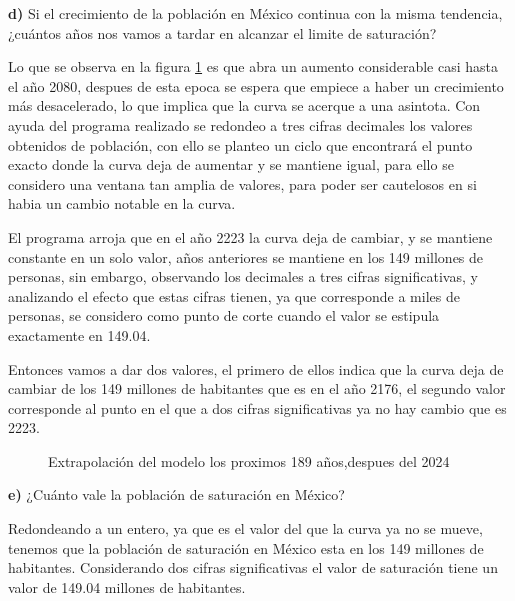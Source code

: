 \documentclass{article}
\begin{document}
\textbf{d)} Si el crecimiento de la población en México continua con la misma tendencia, ¿cuántos años nos vamos a tardar en alcanzar el limite de saturación?

\vspace{10pt}


Lo que se observa en la figura \ref{f2} es que abra un aumento considerable casi hasta el año 2080, despues de esta epoca se espera que empiece a haber un crecimiento más desacelerado, lo que implica que la curva se acerque a una asintota. Con ayuda del programa realizado se redondeo a tres cifras decimales los valores obtenidos de población, con ello se planteo un ciclo que encontrará el punto exacto donde la curva deja de aumentar y se mantiene igual, para ello se considero una ventana tan amplia de valores, para poder ser cautelosos en si habia un cambio notable en la curva. 

\vspace{10pt}

El programa arroja que en el año 2223 la curva deja de cambiar, y se mantiene constante en un solo valor, años anteriores se mantiene en los 149 millones de personas, sin embargo, observando los decimales a tres cifras significativas, y analizando el efecto que estas cifras tienen, ya que corresponde a miles de personas, se considero como punto de corte cuando el valor se estipula exactamente en 149.04. 

\vspace{10pt}

Entonces vamos a dar dos valores, el primero de ellos indica que la curva deja de cambiar de los 149 millones de habitantes que es en el año 2176, el segundo valor corresponde al punto en el que a dos cifras significativas ya no hay cambio que es 2223.


\begin{figure}[h!]
    \centering
    \scalebox{0.7}{}
    \caption{Extrapolación del modelo los proximos 189 años,despues del 2024 }
    \label{f2}
\end{figure}


\textbf{e)} ¿Cuánto vale la población de saturación en México?

\vspace{10pt}

Redondeando a un entero, ya que es el valor del que la curva ya no se mueve, tenemos que la población de saturación en México esta en los 149 millones de habitantes. Considerando dos cifras significativas el valor de saturación tiene un valor de 149.04 millones de habitantes. 
\end{document}

